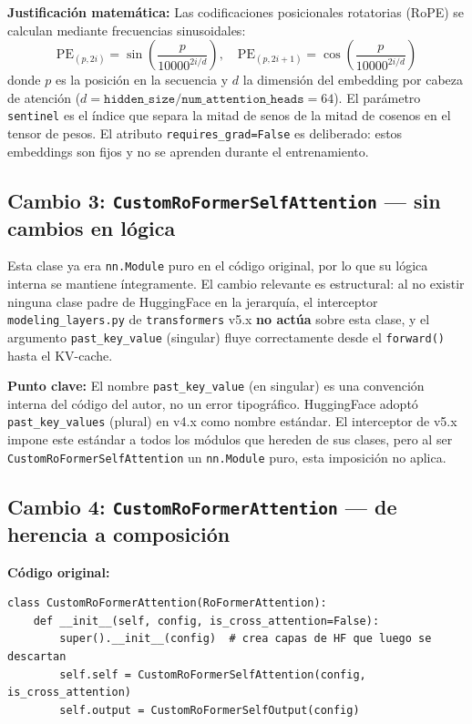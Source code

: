 \documentclass[12pt,a4paper]{article}
\begin{document}
\begin{notebox}
\textbf{Justificación matemática:} Las codificaciones posicionales rotatorias (RoPE)
se calculan mediante frecuencias sinusoidales:
\[
  \text{PE}_{(p,2i)}   = \sin\!\left(\frac{p}{10000^{2i/d}}\right), \quad
  \text{PE}_{(p,2i+1)} = \cos\!\left(\frac{p}{10000^{2i/d}}\right)
\]
donde $p$ es la posición en la secuencia y $d$ la dimensión del embedding por cabeza
de atención ($d = \texttt{hidden\_size} / \texttt{num\_attention\_heads} = 64$).
El parámetro \texttt{sentinel} es el índice que separa la mitad de senos de la mitad
de cosenos en el tensor de pesos. El atributo \texttt{requires\_grad=False} es
deliberado: estos embeddings son fijos y no se aprenden durante el entrenamiento.
\end{notebox}

\subsection{Cambio 3: \texttt{CustomRoFormerSelfAttention} --- sin cambios en lógica}

Esta clase ya era \texttt{nn.Module} puro en el código original, por lo que su lógica
interna se mantiene íntegramente. El cambio relevante es estructural: al no existir
ninguna clase padre de HuggingFace en la jerarquía, el interceptor
\texttt{modeling\_layers.py} de \texttt{transformers} v5.x \textbf{no actúa} sobre
esta clase, y el argumento \texttt{past\_key\_value} (singular) fluye correctamente
desde el \texttt{forward()} hasta el KV-cache.

\begin{notebox}
\textbf{Punto clave:} El nombre \texttt{past\_key\_value} (en singular) es una
convención interna del código del autor, no un error tipográfico. HuggingFace adoptó
\texttt{past\_key\_values} (plural) en v4.x como nombre estándar. El interceptor de
v5.x impone este estándar a todos los módulos que hereden de sus clases, pero al ser
\texttt{CustomRoFormerSelfAttention} un \texttt{nn.Module} puro, esta imposición no
aplica.
\end{notebox}

\subsection{Cambio 4: \texttt{CustomRoFormerAttention} --- de herencia a composición}

\textbf{Código original:}
\begin{lstlisting}[caption={CustomRoFormerAttention original (herencia de HF)}]
class CustomRoFormerAttention(RoFormerAttention):
    def __init__(self, config, is_cross_attention=False):
        super().__init__(config)  # crea capas de HF que luego se descartan
        self.self = CustomRoFormerSelfAttention(config, is_cross_attention)
        self.output = CustomRoFormerSelfOutput(config)
\end{lstlisting}
\end{document}
